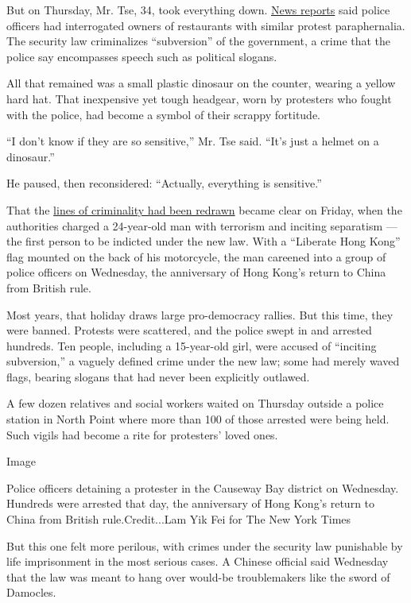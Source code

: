 But on Thursday, Mr. Tse, 34, took everything down.
\href{https://hk.appledaily.com/local/20200702/7WZXFIHG7JRSASWKGI4TUIUMFQ/}{News
reports} said police officers had interrogated owners of restaurants
with similar protest paraphernalia. The security law criminalizes
``subversion'' of the government, a crime that the police say
encompasses speech such as political slogans.

All that remained was a small plastic dinosaur on the counter, wearing a
yellow hard hat. That inexpensive yet tough headgear, worn by protesters
who fought with the police, had become a symbol of their scrappy
fortitude.

``I don't know if they are so sensitive,'' Mr. Tse said. ``It's just a
helmet on a dinosaur.''

He paused, then reconsidered: ``Actually, everything is sensitive.''

That the
\href{https://www.nytimes3xbfgragh.onion/2020/07/01/world/asia/hong-kong-security-law-china.html}{lines
of criminality had been redrawn} became clear on Friday, when the
authorities charged a 24-year-old man with terrorism and inciting
separatism --- the first person to be indicted under the new law. With a
``Liberate Hong Kong'' flag mounted on the back of his motorcycle, the
man careened into a group of police officers on Wednesday, the
anniversary of Hong Kong's return to China from British rule.

Most years, that holiday draws large pro-democracy rallies. But this
time, they were banned. Protests were scattered, and the police swept in
and arrested hundreds. Ten people, including a 15-year-old girl, were
accused of ``inciting subversion,'' a vaguely defined crime under the
new law; some had merely waved flags, bearing slogans that had never
been explicitly outlawed.

A few dozen relatives and social workers waited on Thursday outside a
police station in North Point where more than 100 of those arrested were
being held. Such vigils had become a rite for protesters' loved ones.

Image

Police officers detaining a protester in the Causeway Bay district on
Wednesday. Hundreds were arrested that day, the anniversary of Hong
Kong's return to China from British rule.Credit...Lam Yik Fei for The
New York Times

But this one felt more perilous, with crimes under the security law
punishable by life imprisonment in the most serious cases. A Chinese
official said Wednesday that the law was meant to hang over would-be
troublemakers like the sword of Damocles.

